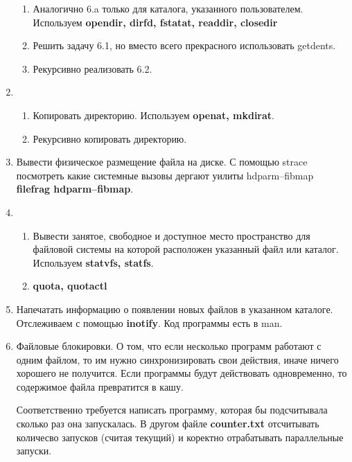 \begin{enumerate}
\begin{enumerate}
        \item Аналогично 6.a только для каталога, указанного пользователем. Используем \textbf{opendir, dirfd, fstatat, readdir, closedir} 
        
        \item Решить задачу 6.1, но вместо всего прекрасного использовать getdents. 
        
        \item Рекурсивно реализовать 6.2. 
    \end{enumerate}
    
    \item 
    
    \begin{enumerate}
        \item Копировать директорию. Используем \textbf{openat, mkdirat}. 
        \item Рекурсивно копировать директорию. 
    \end{enumerate}
    
    \item Вывести физическое размещение файла на диске. С помощью strace посмотреть какие системные вызовы дергают уилиты hdparm--fibmap  \textbf{filefrag hdparm--fibmap}. 
    
    \item 
    \begin{enumerate}
        \item Вывести занятое, свободное и доступное место пространство для файловой системы на которой расположен указанный файл или каталог. Используем \textbf{statvfs, statfs}. 
    
    \item \textbf{quota, quotactl}    
    \end{enumerate}
    
    \item Напечатать информацию о появлении новых файлов в указанном каталоге. Отслеживаем с помощью \textbf{inotify}. Код программы есть в man. 
    
    \item Файловые блокировки. О том, что если несколько программ работают с одним файлом, то им нужно синхронизировать свои действия, иначе ничего хорошего не получится. Если программы будут действовать одновременно, то содержимое файла превратится в кашу. 
    
    Соответственно требуется написать программу, которая бы подсчитывала сколько раз она запускалась. В другом файле \textbf{counter.txt} отсчитывать количесво запусков (считая текущий) и коректно отрабатывать параллельные запуски.  
    

\end{enumerate}
